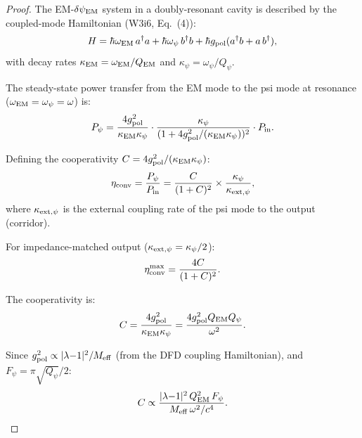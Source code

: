 \documentclass[11pt]{article}
\newcommand{\dpsiEM}{\delta\psi_{\rm EM}}
\newcommand{\Meff}{M_{\rm eff}}
\newcommand{\lambdaone}{|\lambda{-}1|}
\newcommand{\Qpsi}{Q_\psi}
\newcommand{\QEM}{Q_{\rm EM}}
\newcommand{\Fpsi}{F_\psi}
\begin{document}
\begin{proof}
The EM-$\dpsiEM$ system in a doubly-resonant cavity is described by
the coupled-mode Hamiltonian (W3i6, Eq.~(4)):
\begin{equation}
H = \hbar\omega_{\rm EM}\,a^\dagger a + \hbar\omega_\psi\,b^\dagger b
+ \hbar g_{\rm pol}(a^\dagger b + a\,b^\dagger),
\end{equation}
with decay rates $\kappa_{\rm EM} = \omega_{\rm EM}/\QEM$ and
$\kappa_\psi = \omega_\psi/\Qpsi$.

The steady-state power transfer from the EM mode to the psi mode at
resonance ($\omega_{\rm EM} = \omega_\psi = \omega$) is:
\begin{equation}
P_\psi = \frac{4g_{\rm pol}^2}{\kappa_{\rm EM}\kappa_\psi}
\cdot \frac{\kappa_\psi}{(1 + 4g_{\rm pol}^2/(\kappa_{\rm EM}\kappa_\psi))^2}
\cdot P_{\rm in}.
\end{equation}

Defining the cooperativity $C = 4g_{\rm pol}^2/(\kappa_{\rm EM}\kappa_\psi)$:
\begin{equation}
\eta_{\rm conv} = \frac{P_\psi}{P_{\rm in}} = \frac{C}{(1+C)^2}
\times \frac{\kappa_\psi}{\kappa_{\rm ext,\psi}},
\end{equation}
where $\kappa_{\rm ext,\psi}$ is the external coupling rate of the
psi mode to the output (corridor).

For impedance-matched output ($\kappa_{\rm ext,\psi} = \kappa_\psi/2$):
\begin{equation}
\eta_{\rm conv}^{\rm max} = \frac{4C}{(1+C)^2}.
\end{equation}

The cooperativity is:
\begin{equation}
C = \frac{4g_{\rm pol}^2}{\kappa_{\rm EM}\kappa_\psi}
= \frac{4g_{\rm pol}^2 \QEM \Qpsi}{\omega^2}.
\end{equation}

Since $g_{\rm pol}^2 \propto \lambdaone^2/\Meff$ (from the DFD coupling
Hamiltonian), and $\Fpsi = \pi\sqrt{\Qpsi}/2$:
\begin{equation}
C \propto \frac{\lambdaone^2\,\QEM^2\,\Fpsi}{\Meff\,\omega^2/c^4}.
\end{equation}
\end{proof}
\end{document}
